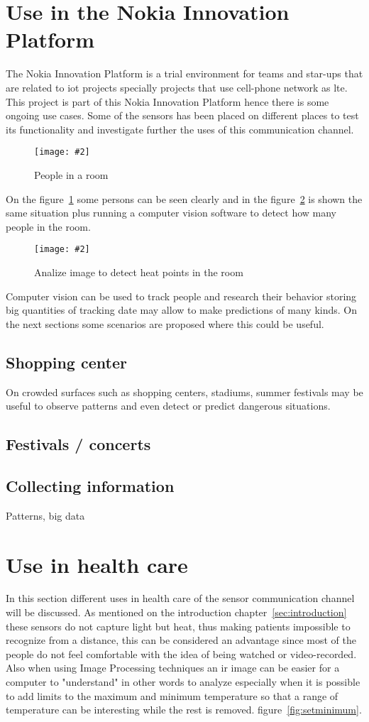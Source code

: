 \documentclass[hidelinks,11pt,a4paper,oneside,article]{memoir}
\newcommand{\putimage}[3][10] %
{
\begin{figure}[h]
	\centering
	\captionsetup{justification=centering}
	\texttt{[image: \#2]}
	\caption{#3}
	\label{fig:#2}
\end{figure}
}
\begin{document}
\section{Use in the Nokia Innovation Platform}
The Nokia Innovation Platform is a trial environment for teams and star-ups that are related to \gls{iot} projects specially projects that use cell-phone network as \gls{lte}. This project is part of this Nokia Innovation Platform hence there is some ongoing use cases. Some of the sensors has been placed on different places to test its functionality and investigate further the uses of this communication channel.

	\putimage{people}{People in a room}
	
On the figure~\ref{fig:people} some persons can be seen clearly and in the figure~\ref{fig:analysed} is shown the same situation plus running a computer vision software to detect how many people in the room.

	\putimage{analysed}{Analize image to detect heat points in the room}

Computer vision can be used to track people and research their behavior storing big quantities of tracking date may allow to make predictions of many kinds. On the next sections some scenarios are proposed where this could be useful.

\subsection{Shopping center}
On crowded surfaces such as shopping centers, stadiums, summer festivals may be useful to observe patterns and even detect or predict dangerous situations.
\subsection{Festivals / concerts}
\subsection{Collecting information}
Patterns, big data


\section{Use in health care}
In this section different uses in health care of the sensor communication channel will be discussed. As mentioned on the introduction chapter~\ref{sec:introduction} these sensors do not capture light but heat, thus making patients impossible to recognize from a distance, this can be considered an advantage since most of the people do not feel comfortable with the idea of being watched or video-recorded. Also when using Image Processing techniques an \gls{ir} image can be easier for a computer to "understand" in other words to analyze especially when it is possible to add limits to the maximum and minimum temperature so that a range of temperature can be interesting while the rest is removed. figure~\ref{fig:setminimum}.
    
\end{document}
